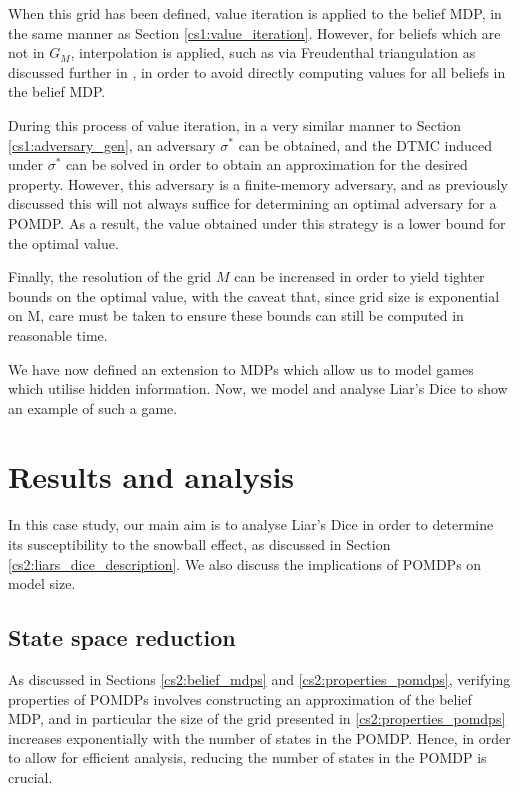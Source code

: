 When this grid has been defined, value iteration is applied to the belief MDP, in the same manner as Section \ref{cs1:value_iteration}. However, for beliefs which are not in $G_M$, interpolation is applied, such as via Freudenthal triangulation as discussed further in \cite{lovejoy_computationally_1991}, in order to avoid directly computing values for all beliefs in the belief MDP.

During this process of value iteration, in a very similar manner to Section \ref{cs1:adversary_gen}, an adversary $\sigma^*$ can be obtained, and the DTMC induced under $\sigma^*$ can be solved in order to obtain an approximation for the desired property. However, this adversary is a finite-memory adversary, and as previously discussed this will not always suffice for determining an optimal adversary for a POMDP. As a result, the value obtained under this strategy is a lower bound for the optimal value.

Finally, the resolution of the grid $M$ can be increased in order to yield tighter bounds on the optimal value, with the caveat that, since grid size is exponential on M, care must be taken to ensure these bounds can still be computed in reasonable time.

We have now defined an extension to MDPs which allow us to model games which utilise hidden information. Now, we model and analyse Liar's Dice to show an example of such a game.

\section{Results and analysis}

In this case study, our main aim is to analyse Liar's Dice in order to determine its susceptibility to the snowball effect, as discussed in Section \ref{cs2:liars_dice_description}. We also discuss the implications of POMDPs on model size.

\subsection{State space reduction}

As discussed in Sections \ref{cs2:belief_mdps} and \ref{cs2:properties_pomdps}, verifying properties of POMDPs involves constructing an approximation of the belief MDP, and in particular the size of the grid presented in \ref{cs2:properties_pomdps} increases exponentially with the number of states in the POMDP. Hence, in order to allow for efficient analysis, reducing the number of states in the POMDP is crucial.

